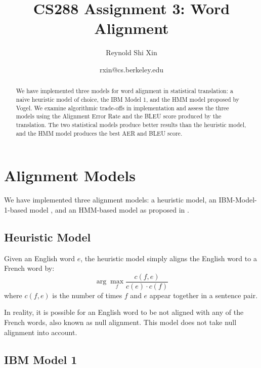 \documentclass[12pt]{article}   %
\begin{document}
\title{CS288 Assignment 3: Word Alignment}   %
\author{Reynold Shi Xin}         %
\date{rxin@cs.berkeley.edu}    %
\maketitle

\begin{abstract}
We have implemented three models for word alignment in statistical translation: a naive heuristic model of choice, the IBM Model 1, and the HMM model proposed by Vogel. We examine algorithmic trade-offs in implementation and assess the three models using the Alignment Error Rate and the BLEU score produced by the translation. The two statistical models produce better results than the heuristic model, and the HMM model produces the best AER and BLEU score.
\end{abstract}


\section{Alignment Models}

We have implemented three alignment models: a heuristic model, an IBM-Model-1-based model \cite{ibm-models}, and an HMM-based model as proposed in \cite{hmm-model}.

\subsection{Heuristic Model}
Given an English word $e$, the heuristic model simply aligns the English word to a French word by:
$$ \arg\max_f \frac{c(f,e)}{c(e) \cdot c(f)} $$
where $c(f,e)$ is the number of times $f$ and $e$ appear together in a sentence pair.

In reality, it is possible for an English word to be not aligned with any of the French words, also known as null alignment. This model does not take null alignment into account.


\subsection{IBM Model 1}
\label{sec:em}
\end{document}
